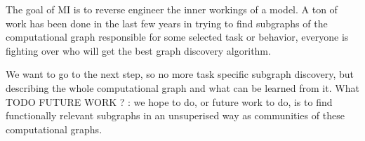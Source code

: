 \documentclass{article}
\begin{document}
%






The goal of MI is to reverse engineer the inner workings of a model.
A ton of work has been done in the last few years in trying to find subgraphs of the computational graph responsible for some selected task or behavior, everyone is fighting over who will get the best graph discovery algorithm.

We want to go to the next step, so no more task specific subgraph discovery, but describing the whole computational graph and what can be learned from it. What TODO FUTURE WORK ? : we hope to do, or future work to do, is to find functionally relevant subgraphs in an unsuperised way as communities of these computational graphs. %
\end{document}
